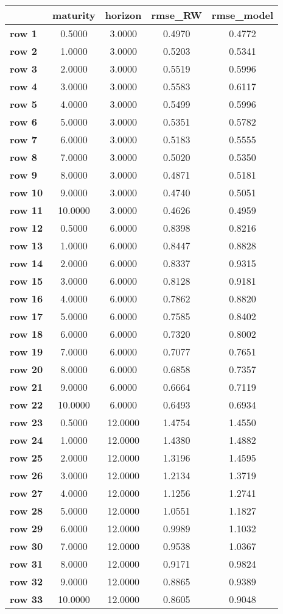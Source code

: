 \begin{tiny}\begin{tabular}{|l|c|c|c|c|}
\hline
&\textbf{maturity}&\textbf{horizon}&\textbf{rmse_RW}&\textbf{rmse_model}\\\hline
\textbf{row 1}&0.5000&3.0000&0.4970&0.4772\\\hline
\textbf{row 2}&1.0000&3.0000&0.5203&0.5341\\\hline
\textbf{row 3}&2.0000&3.0000&0.5519&0.5996\\\hline
\textbf{row 4}&3.0000&3.0000&0.5583&0.6117\\\hline
\textbf{row 5}&4.0000&3.0000&0.5499&0.5996\\\hline
\textbf{row 6}&5.0000&3.0000&0.5351&0.5782\\\hline
\textbf{row 7}&6.0000&3.0000&0.5183&0.5555\\\hline
\textbf{row 8}&7.0000&3.0000&0.5020&0.5350\\\hline
\textbf{row 9}&8.0000&3.0000&0.4871&0.5181\\\hline
\textbf{row 10}&9.0000&3.0000&0.4740&0.5051\\\hline
\textbf{row 11}&10.0000&3.0000&0.4626&0.4959\\\hline
\textbf{row 12}&0.5000&6.0000&0.8398&0.8216\\\hline
\textbf{row 13}&1.0000&6.0000&0.8447&0.8828\\\hline
\textbf{row 14}&2.0000&6.0000&0.8337&0.9315\\\hline
\textbf{row 15}&3.0000&6.0000&0.8128&0.9181\\\hline
\textbf{row 16}&4.0000&6.0000&0.7862&0.8820\\\hline
\textbf{row 17}&5.0000&6.0000&0.7585&0.8402\\\hline
\textbf{row 18}&6.0000&6.0000&0.7320&0.8002\\\hline
\textbf{row 19}&7.0000&6.0000&0.7077&0.7651\\\hline
\textbf{row 20}&8.0000&6.0000&0.6858&0.7357\\\hline
\textbf{row 21}&9.0000&6.0000&0.6664&0.7119\\\hline
\textbf{row 22}&10.0000&6.0000&0.6493&0.6934\\\hline
\textbf{row 23}&0.5000&12.0000&1.4754&1.4550\\\hline
\textbf{row 24}&1.0000&12.0000&1.4380&1.4882\\\hline
\textbf{row 25}&2.0000&12.0000&1.3196&1.4595\\\hline
\textbf{row 26}&3.0000&12.0000&1.2134&1.3719\\\hline
\textbf{row 27}&4.0000&12.0000&1.1256&1.2741\\\hline
\textbf{row 28}&5.0000&12.0000&1.0551&1.1827\\\hline
\textbf{row 29}&6.0000&12.0000&0.9989&1.1032\\\hline
\textbf{row 30}&7.0000&12.0000&0.9538&1.0367\\\hline
\textbf{row 31}&8.0000&12.0000&0.9171&0.9824\\\hline
\textbf{row 32}&9.0000&12.0000&0.8865&0.9389\\\hline
\textbf{row 33}&10.0000&12.0000&0.8605&0.9048\\\hline
\end{tabular}
\end{tiny}